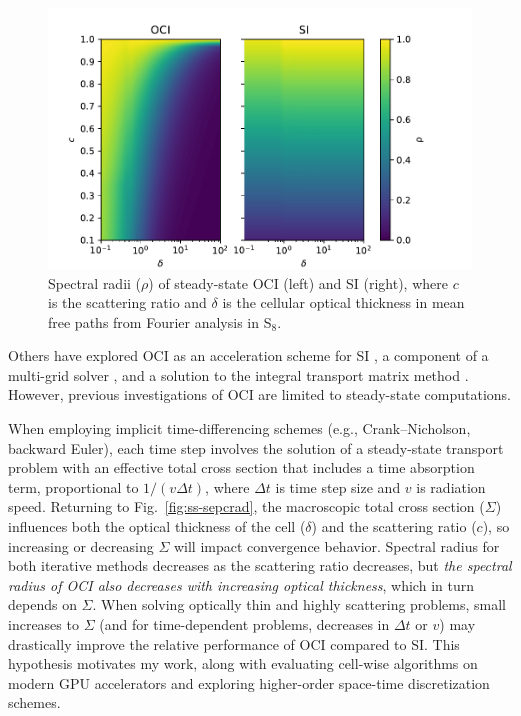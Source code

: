 \begin{figure}[htbp]
    \centering
    \includegraphics[width=\textwidth]{figures/therefore_figs/ss_specrads.pdf}
    \caption{Spectral radii (${\rho}$) of steady-state OCI (left) and SI (right), where $c$ is the scattering ratio and ${\delta}$ is the cellular optical thickness in mean free paths from Fourier analysis in S$_8$.}
    \label{fig:c2_ss-sepcrad}
\end{figure}

Others have explored OCI as an acceleration scheme for SI \cite{hoagland_hybrid_2021}, a component of a multi-grid solver \cite{man1995multigrid1, man1996multigrid2}, and a solution to the integral transport matrix method \cite{raffi2108pidotscom}.
However, previous investigations of OCI are limited to steady-state computations.

When employing implicit time-differencing schemes (e.g., Crank--Nicholson, backward Euler), each time step involves the solution of a steady-state transport problem with an effective total cross section that includes a time absorption term, proportional to $1/(v \Delta t)$, where $\Delta t$ is time step size and $v$ is radiation speed.
Returning to Fig.~\ref{fig:ss-sepcrad}, the macroscopic total cross section ($\Sigma$) influences both the optical thickness of the cell ($\delta$) and the scattering ratio ($c$), so increasing or decreasing $\Sigma$ will impact convergence behavior.
Spectral radius for both iterative methods decreases as the scattering ratio decreases, but \textit{the spectral radius of OCI also decreases with increasing optical thickness}, which in turn depends on $\Sigma$.
When solving optically thin and highly scattering problems, small increases to $\Sigma$ (and for time-dependent problems, decreases in $\Delta t$ or $v$) may drastically improve the relative performance of OCI compared to SI.
This hypothesis motivates my work, along with evaluating cell-wise algorithms on modern GPU accelerators and exploring higher-order space-time discretization schemes.

